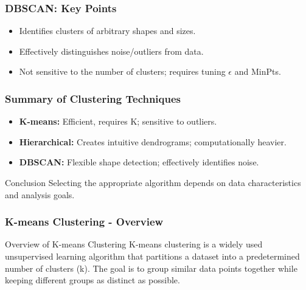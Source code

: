 \documentclass[aspectratio=169]{beamer}
\begin{document}
\begin{frame}[fragile]
  \frametitle{DBSCAN: Key Points}
  \begin{itemize}
    \item Identifies clusters of arbitrary shapes and sizes.
    \item Effectively distinguishes noise/outliers from data.
    \item Not sensitive to the number of clusters; requires tuning $\epsilon$ and MinPts.
  \end{itemize}
\end{frame}

\begin{frame}[fragile]
  \frametitle{Summary of Clustering Techniques}
  \begin{itemize}
    \item \textbf{K-means:} Efficient, requires K; sensitive to outliers.
    \item \textbf{Hierarchical:} Creates intuitive dendrograms; computationally heavier.
    \item \textbf{DBSCAN:} Flexible shape detection; effectively identifies noise.
  \end{itemize}
  \begin{block}{Conclusion}
    Selecting the appropriate algorithm depends on data characteristics and analysis goals.
  \end{block}
\end{frame}

\begin{frame}[fragile]
    \frametitle{K-means Clustering - Overview}
    \begin{block}{Overview of K-means Clustering}
        K-means clustering is a widely used unsupervised learning algorithm that partitions a dataset into a predetermined number of clusters (k). The goal is to group similar data points together while keeping different groups as distinct as possible.
    \end{block}
\end{frame}
\end{document}
